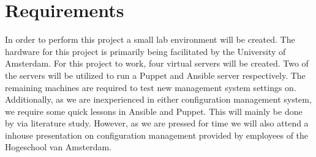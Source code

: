 \section{Requirements}\label{sec:requirements}
In order to perform this project a small lab environment will be created. The hardware for this project is primarily being facilitated by the University of Amsterdam. For this project to work, four virtual servers will be created. Two of the servers will be utilized to run a Puppet and Ansible server respectively. The remaining machines are required to test new management system settings on. Additionally, as we are inexperienced in either configuration management system, we require some quick lessons in Ansible and Puppet. This will mainly be done by via literature study. However, as we are pressed for time we will also attend a inhouse presentation on configuration management provided by employees of the Hogeschool van Amsterdam.

